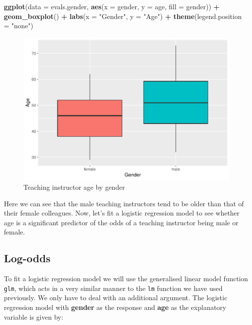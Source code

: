 \documentclass[]{article}
\newenvironment{Shaded}{\begin{snugshade}}{\end{snugshade}}
\newcommand{\KeywordTok}[1]{\textcolor[rgb]{0.13,0.29,0.53}{\textbf{#1}}}
\newcommand{\DataTypeTok}[1]{\textcolor[rgb]{0.13,0.29,0.53}{#1}}
\newcommand{\StringTok}[1]{\textcolor[rgb]{0.31,0.60,0.02}{#1}}
\newcommand{\OperatorTok}[1]{\textcolor[rgb]{0.81,0.36,0.00}{\textbf{#1}}}
\newcommand{\NormalTok}[1]{#1}
\begin{document}
\begin{Shaded}
\begin{Highlighting}[]
\KeywordTok{ggplot}\NormalTok{(}\DataTypeTok{data =}\NormalTok{ evals.gender, }\KeywordTok{aes}\NormalTok{(}\DataTypeTok{x =}\NormalTok{ gender, }\DataTypeTok{y =}\NormalTok{ age, }\DataTypeTok{fill =}\NormalTok{ gender)) }\OperatorTok{+}
\StringTok{  }\KeywordTok{geom_boxplot}\NormalTok{() }\OperatorTok{+}
\StringTok{  }\KeywordTok{labs}\NormalTok{(}\DataTypeTok{x =} \StringTok{"Gender"}\NormalTok{, }\DataTypeTok{y =} \StringTok{"Age"}\NormalTok{) }\OperatorTok{+}
\StringTok{  }\KeywordTok{theme}\NormalTok{(}\DataTypeTok{legend.position =} \StringTok{"none"}\NormalTok{)}
\end{Highlighting}
\end{Shaded}

\begin{figure}

{\centering \includegraphics[width=0.5\linewidth]{DAWeek9_files/figure-latex/boxplot1-1} 

}

\caption{\label{fig.plot1}Teaching instructor age by gender}\label{fig:boxplot1}
\end{figure}

Here we can see that the male teaching instructors tend to be older than
that of their female colleagues. Now, let's fit a logistic regression
model to see whether age is a significant predictor of the odds of a
teaching instructor being male or female.

\subsection{Log-odds}\label{log-odds}

To fit a logistic regression model we will use the generalised linear
model function \texttt{glm}, which acts in a very similar manner to the
\texttt{lm} function we have used previously. We only have to deal with
an additional argument. The logistic regression model with
\textbf{gender} as the response and \textbf{age} as the explanatory
variable is given by:
\end{document}
